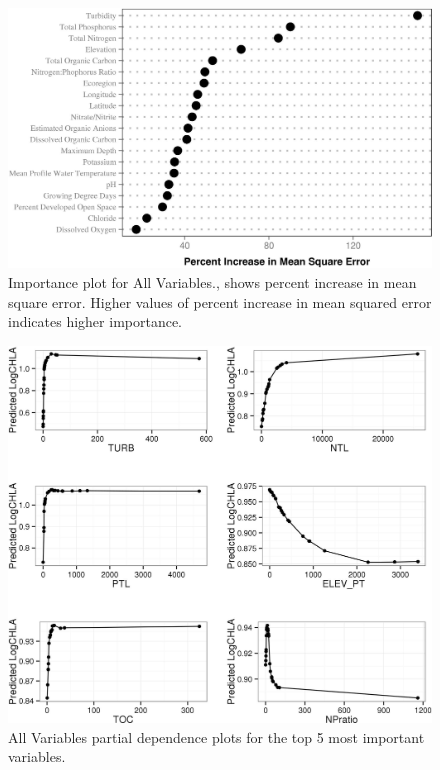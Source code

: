 \documentclass[11pt,]{article}
\begin{document}
\newpage

\begin{figure}[htbp]
\centering
\includegraphics{manuscript_files/figure-latex/All_Importance-1.jpeg}
\caption{Importance plot for All Variables., shows percent increase in
mean square error. Higher values of percent increase in mean squared
error indicates higher importance. \label{fig:All_Importance}}
\end{figure}

\newpage

\begin{figure}[htbp]
\centering
\includegraphics{manuscript_files/figure-latex/all_partial_dependence-1.jpeg}
\caption{All Variables partial dependence plots for the top 5 most
important variables. \label{fig:all_partial_dependence}}
\end{figure}
\end{document}
